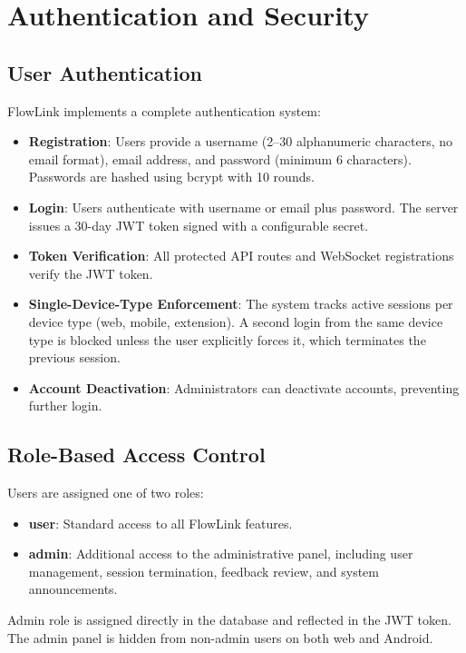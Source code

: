 \documentclass[conference]{IEEEtran}
\begin{document}
\section{Authentication and Security}

\subsection{User Authentication}

FlowLink implements a complete authentication system:

\begin{itemize}
    \item \textbf{Registration}: Users provide a username (2--30 alphanumeric characters, no email format), email address, and password (minimum 6 characters). Passwords are hashed using bcrypt with 10 rounds.
    \item \textbf{Login}: Users authenticate with username or email plus password. The server issues a 30-day JWT token signed with a configurable secret.
    \item \textbf{Token Verification}: All protected API routes and WebSocket registrations verify the JWT token.
    \item \textbf{Single-Device-Type Enforcement}: The system tracks active sessions per device type (web, mobile, extension). A second login from the same device type is blocked unless the user explicitly forces it, which terminates the previous session.
    \item \textbf{Account Deactivation}: Administrators can deactivate accounts, preventing further login.
\end{itemize}

\subsection{Role-Based Access Control}

Users are assigned one of two roles:
\begin{itemize}
    \item \textbf{user}: Standard access to all FlowLink features.
    \item \textbf{admin}: Additional access to the administrative panel, including user management, session termination, feedback review, and system announcements.
\end{itemize}

Admin role is assigned directly in the database and reflected in the JWT token. The admin panel is hidden from non-admin users on both web and Android.
\end{document}
